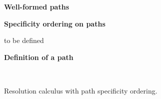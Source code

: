 \begin{figure}[p]
\begin{boxedminipage}{\hsize}


\textbf{Well-formed paths}

	
\textbf{Specificity ordering on paths}

\bigskip

   to be defined

\smallskip

\textbf{Definition of a path}

  \vspace*{-\baselineskip}
  
  \\[-10pt]
  \vspace*{-2\baselineskip}
\end{boxedminipage}
\caption{Resolution calculus with path specificity ordering.}
\label{fig:rescalc}
\label{fig:order}
\end{figure}
